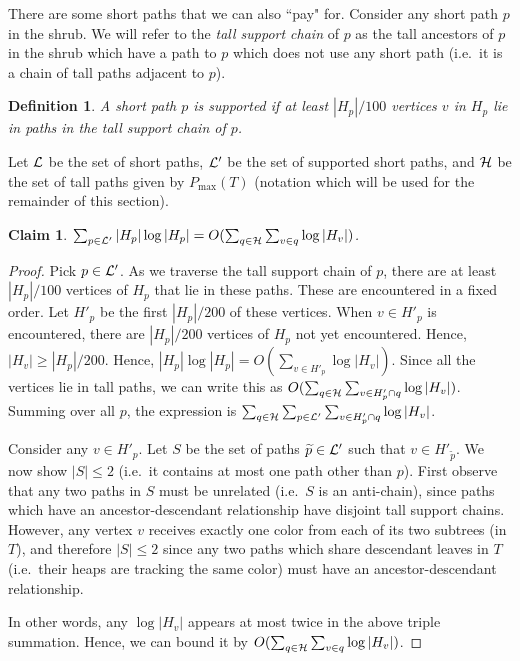 \documentclass[11pt]{article}
\newtheorem{claim}[theorem]{Claim}
\newtheorem{definition}[theorem]{Definition}
\theoremstyle{definition}
\newcommand{\cH}{{\cal H}}
\newcommand{\cL}{{\cal L}}
\newcommand{\pmax}{P_{\max}}
\begin{document}
There are some short paths that we can also ``pay" for.  Consider any short path $p$ in the shrub.  We will refer to the 
\emph{tall support chain} of $p$ as the tall ancestors of $p$ in the shrub which have a path to $p$ which does not use any 
short path (i.e.\ it is a chain of tall paths adjacent to $p$).

\begin{definition} \label{def:support} A short path $p$ is \emph{supported} if
at least $|H_p|/100$ vertices $v$ in $H_p$ lie in paths in the tall support chain of $p$.
\end{definition}

Let $\cL$ be the set of short paths, $\cL'$ be the set of supported short paths, and $\cH$ be the set of tall paths
given by $\pmax(T)$ (notation which will be used for the remainder of this section).  

\begin{claim} \label{clm:above} 
$\sum_{p \in \cL'} |H_p| \log |H_p| = O(\sum_{q \in \cH} \sum_{v \in q} \log |H_v|)$.
\end{claim}
\begin{proof} 
Pick $p \in \cL'$. 
As we traverse the tall support chain of $p$, there
are at least $|H_p|/100$ vertices of $H_p$ that lie in these paths. These are encountered in
a fixed order. Let $H'_p$ be the first $|H_p|/200$ of these vertices. When $v \in H'_p$
is encountered, there are $|H_p|/200$ vertices of $H_p$ not yet encountered. Hence,
$|H_v| \geq |H_p|/200$. Hence, $|H_p|\log |H_p| = O(\sum_{v \in H'_p} \log |H_v|)$.
Since all the vertices lie in tall paths,
we can write this as $O(\sum_{q \in \cH} \sum_{v \in H'_p \cap q} \log |H_v|)$.
Summing over all $p$, the expression is $\sum_{q \in \cH} \sum_{p \in \cL'} \sum_{v \in H'_p \cap q} \log |H_v|$.

Consider any $v \in H'_p$.  Let $S$ be the set of paths $\widetilde{p}\in \cL'$ such that 
$v\in H'_{\widetilde{p}}$.  We now show $|S|\leq 2$ (i.e.\ it contains at most one path other than $p$).
First observe that any two paths in $S$ must be unrelated (i.e.\ $S$ is an anti-chain), 
since paths which have an ancestor-descendant relationship have disjoint tall support chains.  
However, any vertex $v$ receives exactly one color from each of its two subtrees (in $T$), and therefore $|S|\leq 2$ since any two 
paths which share descendant leaves in $T$ (i.e.\ their heaps are tracking the same color) must have an ancestor-descendant relationship.

In other words, any $\log |H_v|$ appears at most twice in the above triple summation.
Hence, we can bound it by $O(\sum_{q \in \cH} \sum_{v \in q} \log |H_v|)$.
\end{proof}
\end{document}
